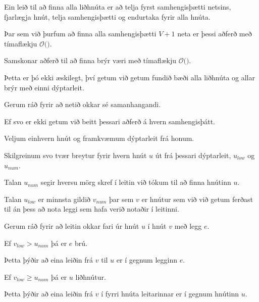 {
	{
		\item<1-> Ein leið til að finna alla liðhnúta er að telja fyrst samhengisþætti netsins, fjarlægja hnút, telja samhengisþætti
					og endurtaka fyrir alla hnúta.
		\item<2-> Þar sem við þurfum að finna alla samhengisþætti $V + 1$ neta er þessi aðferð með tímaflækju $\mathcal{O}($\onslide<3->{$V^2 + VE$}$)$.
		\item<4-> Samskonar aðferð til að finna brýr væri með tímaflækju $\mathcal{O}($\onslide<5->{$E^2 + VE$}$)$.
		\item<5-> Þetta er þó ekki æskilegt, því getum við getum fundið bæði alla liðhnúta og allar brýr með einni dýptarleit.
	}
}

{
	{
		\item<1-> Gerum ráð fyrir að netið okkar sé samanhangandi.
		\item<2-> Ef svo er ekki getum við beitt þessari aðferð á hvern samhengisþátt.
		\item<3-> Veljum einhvern hnút og framkvæmum dýptarleit frá honum.
		\item<4-> Skilgreinum svo tvær breytur fyrir hvern hnút $u$ út frá þessari dýptarleit, $u_{low}$ og $u_{num}$.
		\item<5-> Talan $u_{num}$ segir hversu mörg skref í leitin við tókum til að finna hnútinn $u$.
		\item<6-> Talan $u_{low}$ er minnsta gildið $v_{num}$ þar sem $v$ er hnútur sem við við getum ferðast til án þess að nota leggi
					sem hafa verið notaðir í leitinni.
	}
}

{
	{
		\item<1-> Gerum ráð fyrir að leitin okkar fari úr hnút $u$ í hnút $v$ með legg $e$.
		\item<2-> Ef $v_{low} > u_{num}$ þá er $e$ brú.
		\item<3-> Þetta þýðir að eina leiðin frá $v$ til $u$ er í gegnum legginn $e$.
		\item<4-> Ef $v_{low} \geq u_{num}$ þá er $u$ liðhnútur.
		\item<5-> Þetta þýðir að eina leiðin frá $v$ í fyrri hnúta leitarinnar er í gegnum hnútinn $u$.
	}
}


